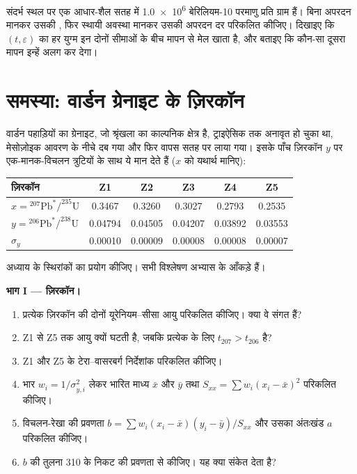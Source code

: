 \begin{exercise}[$\star\star\star$]\label{exo:b3:advanced-geochronology:12}
संदर्भ स्थल पर एक आधार-शैल सतह में \num{1.0e6} बेरिलियम-10 परमाणु
प्रति ग्राम हैं। बिना अपरदन मानकर उसकी , फिर
स्थायी अवस्था मानकर उसकी अपरदन दर परिकलित कीजिए। दिखाइए कि $(t, \varepsilon)$ का हर युग्म
इन दोनों सीमाओं के बीच मापन से मेल खाता है, और बताइए कि कौन-सा दूसरा
मापन इन्हें अलग कर देगा।
\end{exercise}

\section{समस्या: वार्डन ग्रेनाइट के ज़िरकॉन}

\begin{problem}\label{pb:b3:advanced-geochronology:1}
वार्डन पहाड़ियों का ग्रेनाइट, जो श्रृंखला का काल्पनिक क्षेत्र है, ट्राइऐसिक तक
अनावृत हो चुका था, मेसोज़ोइक आवरण के नीचे दब गया और फिर वापस
सतह पर लाया गया। इसके पाँच ज़िरकॉन $y$ पर एक-मानक-विचलन त्रुटियों के साथ
ये मान देते हैं ($x$ को यथार्थ मानिए):
\begin{center}
\small
\begin{tabular}{|l|ccccc|}
\hline
ज़िरकॉन & Z1 & Z2 & Z3 & Z4 & Z5 \\
\hline
$x = {}^{207}\mathrm{Pb}^*/^{235}\mathrm U$ & 0.3467 & 0.3260 & 0.3027 & 0.2793 & 0.2535 \\
$y = {}^{206}\mathrm{Pb}^*/^{238}\mathrm U$ & 0.04794 & 0.04505 & 0.04207 & 0.03892 & 0.03553 \\
$\sigma_y$ & 0.00010 & 0.00009 & 0.00008 & 0.00008 & 0.00007 \\
\hline
\end{tabular}
\end{center}
अध्याय के स्थिरांकों का प्रयोग कीजिए। सभी विश्लेषण अभ्यास के आँकड़े हैं।

\medskip\noindent\textbf{भाग I --- ज़िरकॉन।}
\begin{enumerate}
\item प्रत्येक ज़िरकॉन की दोनों यूरेनियम--सीसा आयु परिकलित कीजिए। क्या वे संगत हैं?
\item Z1 से Z5 तक आयु क्यों घटती है, जबकि
प्रत्येक के लिए $t_{207} > t_{206}$ है?
\item Z1 और Z5 के टेरा--वासरबर्ग निर्देशांक परिकलित कीजिए।
\item भार $w_i = 1/\sigma_{y,i}^2$ लेकर भारित माध्य
$\bar x$ और $\bar y$ तथा $S_{xx} = \sum w_i(x_i - \bar x)^2$ परिकलित कीजिए।
\item विचलन-रेखा की प्रवणता $b = \sum w_i(x_i - \bar x)(y_i - \bar y)/S_{xx}$ और
उसका अंतःखंड $a$ परिकलित कीजिए।
\item $b$ की तुलना \qty{310}{\Ma} के निकट  की प्रवणता से कीजिए।
यह क्या संकेत देता है?
\end{enumerate}


\end{problem}
